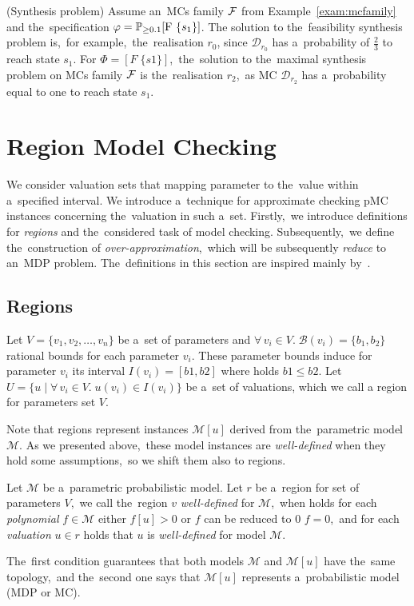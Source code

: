 \begin{example} (Synthesis problem)
Assume an~MCs family $\mathcal{F}$ from Example~\ref{exam:mcfamily} and the~specification $\varphi = \mathbb{P}_{\geq 0.1}[\mathrm{F}\ \{s_1\}]$.
The solution to the~feasibility synthesis problem is,~for example,~the~realisation $r_0$, since $\mathcal{D}_{r_0}$ has a~probability of $\frac{2}{3}$ to reach state $s_1$.
For $\varPhi = [F \; \{s1\}]$,~the~solution to the~maximal synthesis problem on MCs family $\mathcal{F}$ is the~realisation $r_2$,~as MC $\mathcal{D}_{r_2}$ has a~probability equal to one to reach state $s_1$.
\end{example}

\section{Region Model Checking} \label{sec:regional_model}
We consider valuation sets that mapping parameter to the~value within a~specified interval. 
We introduce a~technique for approximate checking pMC instances concerning the~valuation in such a~set.
Firstly,~we introduce definitions for \textit{regions} and the~considered task of model checking.
Subsequently,~we define the~construction of \textit{over-approximation},~which will be subsequently \textit{reduce} to an~MDP problem.
The~definitions in this section are inspired mainly by~\cite{Quatmann2016}.

\subsection{Regions}
\begin{definition}[Region]
Let $V = \{ v_1, v_2, \dots, v_n \}$ be a~set of parameters and $\forall \, v_i \in V. \; \mathcal{B}(v_i) = \{b_1, b_2 \}$ rational bounds for each parameter $v_i$.
These parameter bounds induce for parameter $v_i$ its interval $I(v_i) = [b1, b2]$ where holds $b1 \leq b2$.
Let $U = \{ u \; \lvert \; \forall \, v_i \in V. \; u(v_i) \in I(v_i) \}$ be a~set of valuations, which we call a region for parameters set $V$.
\end{definition}
\noindent
Note that regions represent instances $\mathcal{M}[u]$ derived from the~parametric model $\mathcal{M}$.
As we presented above,~these model instances are \textit{well-defined} when they hold some assumptions,~so we shift them also to regions.

\begin{definition}
Let $\mathcal{M}$ be a~parametric probabilistic model.
Let $r$ be a~region for set of parameters $V$,~we call the~region $v$ \textit{well-defined} for $\mathcal{M}$,~when holds for each \textit{polynomial} $f \in \mathcal{M}$ either $f[u] > 0$ or  $f$ can be reduced to 0 $f = 0$,~and for each \textit{valuation} $u \in r$ holds that $u$ is \textit{well-defined} for model $\mathcal{M}$.
\end{definition}
\noindent
The~first condition guarantees that both models $\mathcal{M}$ and $\mathcal{M}[u]$ have the~same topology,~and the~second one says that $\mathcal{M}[u]$ represents a~probabilistic model (MDP or MC).

